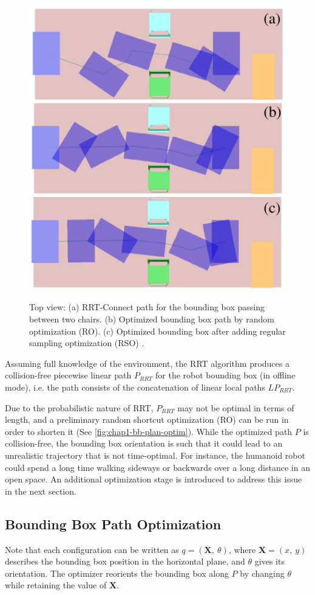 \begin{figure}
  \centering
      {\includegraphics[width = 0.8\linewidth]
        {src/chap1-path-optimization/bb-plan-optim.pdf}}
      \caption{Top view: (a) RRT-Connect path for the bounding box
        passing between two chairs. (b) Optimized bounding box path by
        random optimization (RO). (c) Optimized bounding box after
        adding regular sampling optimization (RSO) .}
      \label{fig:chap1-bb-plan-optim}
\end{figure}

Assuming full knowledge of the environment, the RRT algorithm produces
a collision-free piecewise linear path $P_{RRT}$ for the robot
bounding box (in offline mode), i.e. the path consists of the
concatenation of linear local paths $LP_{RRT}$.

Due to the probabilistic nature of RRT, $P_{RRT}$ may not be optimal
in terms of length, and a preliminary random shortcut optimization
(RO) can be run in order to shorten it (See
\autoref{fig:chap1-bb-plan-optim}). While the optimized path $P$ is
collision-free, the bounding box orientation is such that it could
lead to an unrealistic trajectory that is not time-optimal. For
instance, the humanoid robot could spend a long time walking sideways
or backwards over a long distance in an open space. An additional
optimization stage is introduced to address this issue in the next
section.

\subsection{Bounding Box Path Optimization}
Note that each configuration \config{} can be written as $q =
(\mathbf{X},~\theta)$, where $\mathbf{X} = (x,~y)$ describes the
bounding box position in the horizontal plane, and $\theta$ gives its
orientation.  The optimizer reorients the bounding box along $P$ by
changing $\theta$ while retaining the value of $\mathbf{X}$.

